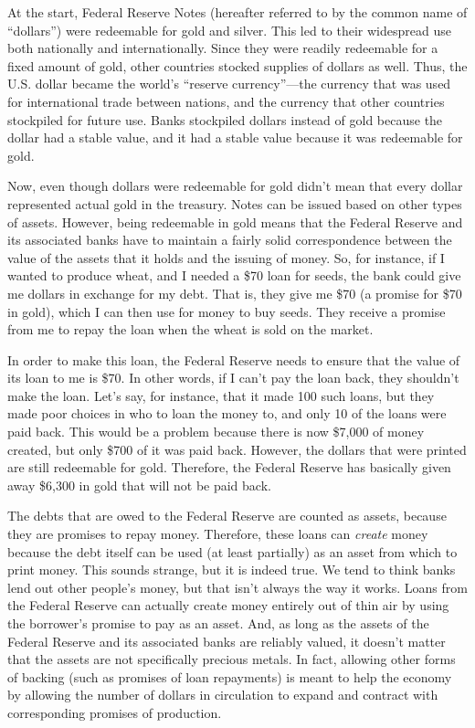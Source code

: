 At the start, Federal Reserve Notes (hereafter referred to by the common
name of “dollars”) were redeemable for gold and silver. This led to
their widespread use both nationally and internationally. Since they
were readily redeemable for a fixed amount of gold, other countries
stocked supplies of dollars as well. Thus, the U.S. dollar became the
world’s “reserve currency”—the currency that was used for international
trade between nations, and the currency that other countries stockpiled
for future use. Banks stockpiled dollars instead of gold because the dollar had a stable value, and it
had a stable value because it was redeemable for gold.

Now, even though dollars were redeemable for gold didn’t mean that every
dollar represented actual gold in the treasury. Notes can be issued
based on other types of assets. However, being redeemable in gold means
that the Federal Reserve and its associated banks have to maintain a fairly solid correspondence
between the value of the assets that it holds and the issuing of money.
So, for instance, if I wanted to produce wheat, and I needed a \$70
loan for seeds, the bank could give me dollars in exchange for my
debt. That is, they give me \$70 (a promise for \$70 in gold), which I
can then use for money to buy seeds. They receive a promise from me to repay the
loan when the wheat is sold on the market. 

In order to make this loan, the Federal Reserve needs to ensure that the
value of its loan to me is \$70. In other words, if I can't pay the loan
back, they shouldn't make the loan.  Let’s say, for instance, that it made
100 such loans, but they made poor choices in who to loan the money to, 
and only 10 of the loans were paid back. This would be a
problem because there is now \$7,000 of money created, but only \$700
of it was paid back. However, the dollars that were printed are still
redeemable for gold. Therefore, the Federal Reserve has basically given
away \$6,300 in gold that will not be paid back. 

The debts that are owed to the Federal Reserve are counted as assets, 
because they are promises to repay money.  Therefore, these loans can \textit{create}
money because the debt itself can be used (at least partially) as an asset from which to print money.
This sounds strange, but it is indeed true.  We tend to think banks lend out
other people's money, but that isn't always the way it works.  Loans 
from the Federal Reserve can actually create money entirely out of 
thin air by using the
borrower's promise to pay as an asset.  And, as long as the assets
of the Federal Reserve and its associated banks are reliably valued, it doesn’t matter
that the assets are not specifically precious metals. In fact, allowing other
forms of backing (such as promises of loan repayments) is meant to help the economy
by allowing the
number of dollars in circulation to expand and contract with
corresponding promises of production. 

